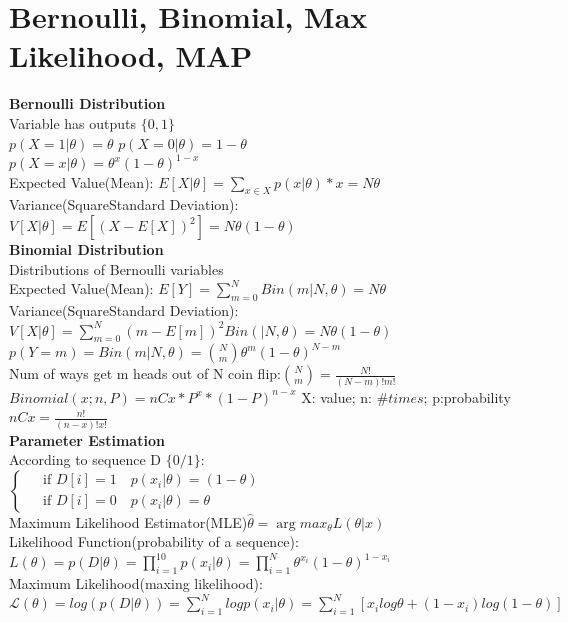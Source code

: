 \documentclass[12pt,a4paper]{extarticle}
\begin{document}
\section{Bernoulli, Binomial, Max Likelihood, MAP}
\textbf{Bernoulli Distribution}\\
Variable has outputs $\{0,1\}$\\
$p(X=1|\theta)=\theta$ \quad $p(X=0|\theta)=1-\theta$\\
$p(X=x|\theta)=\theta ^x (1-\theta)^{1-x}$\\
Expected Value(Mean): $E[X|\theta]=\sum_{x\in X} p(x|\theta)*x=N\theta$\\
Variance(SquareStandard Deviation): $V[X|\theta]=E[(X-E[X])^2]=N\theta(1-\theta)$\\
\newline
\textbf{Binomial Distribution}\\
Distributions of Bernoulli variables\\
Expected Value(Mean): $E[Y]=\sum_{m=0}^N Bin(m|N,\theta)=N\theta$\\
Variance(SquareStandard Deviation): $V[X|\theta]=\sum_{m=0}^N(m-E[m])^2Bin(|N,\theta)=N\theta(1-\theta)$\\
$p(Y=m)=Bin(m|N,\theta)=\binom{N}{m}\theta^m(1-\theta)^{N-m}$\\
Num of ways get m heads out of N coin flip:$\binom{N}{m}=\frac{N!}{(N-m)!m!}$\\
$Binomial(x; n, P) = nCx * P^x * (1 - P)^{n - x} $ X: value; n: $\# times$; p:probability \\
$nCx = \frac{n!}{(n-x)!x!}$\\
\newline
\textbf{Parameter Estimation}\\
According to sequence D $\{0/1\}$:\\
$\begin{cases}
 & \text{ if } D[i]=1 \quad p(x_i|\theta)=(1-\theta)\\ 
 & \text{ if } D[i]=0 \quad p(x_i|\theta)=\theta
\end{cases}$\\
Maximum Likelihood Estimator(MLE)$\hat{\theta} =\arg max_\theta L(\theta|x)$\\
Likelihood Function(probability of a sequence): $L(\theta)=p(D|\theta)=\prod ^{10}_{i=1}p(x_i|\theta)=\prod^N_{i=1}\theta^{x_i}(1-\theta)^{1-x_i}$\\
Maximum Likelihood(maxing likelihood): $\mathcal{L}(\theta)=log(p(D|\theta))=\sum^N_{i=1}log p(x_i|\theta)=\sum^N_{i=1}[x_ilog\theta + (1-x_i)log(1-\theta)]$\\
\end{document}
